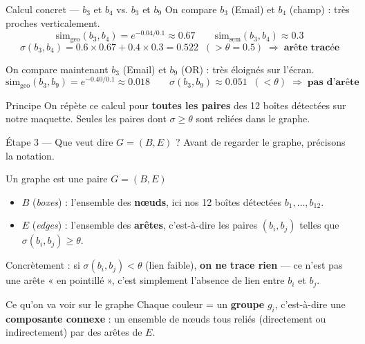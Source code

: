 \documentclass[11pt,aspectratio=169]{beamer}
\begin{document}
\begin{frame}{Calcul concret --- $b_3$ et $b_4$ vs. $b_3$ et $b_9$}
On compare $b_3$ (Email) et $b_4$ (champ) : très proches verticalement.
\[
\text{sim}_{\text{geo}}(b_3,b_4) = e^{-0.04/0.1} \approx 0.67
\qquad
\text{sim}_{\text{sem}}(b_3,b_4) \approx 0.3
\]
\[
\sigma(b_3,b_4) = 0.6 \times 0.67 + 0.4 \times 0.3 = 0.522 \;\; (> \theta = 0.5) \;\Rightarrow\; \textbf{arête tracée}
\]

\vspace{0.3cm}
On compare maintenant $b_3$ (Email) et $b_9$ (OR) : très éloignés sur l'écran.
\[
\text{sim}_{\text{geo}}(b_3,b_9) = e^{-0.40/0.1} \approx 0.018
\qquad
\sigma(b_3,b_9) \approx 0.051 \;\; (< \theta) \;\Rightarrow\; \textbf{pas d'arête}
\]

\begin{block}{Principe}
On répète ce calcul pour \textbf{toutes les paires} des 12 boîtes détectées sur notre maquette. Seules les paires dont $\sigma \geq \theta$ sont reliées dans le graphe.
\end{block}
\end{frame}

\begin{frame}{Étape 3 --- Que veut dire $G = (B,E)$ ?}
Avant de regarder le graphe, précisons la notation.

\vspace{0.3cm}
\begin{block}{Un graphe est une paire $G = (B, E)$}
\begin{itemize}
    \item $B$ (\emph{boxes}) : l'ensemble des \textbf{n\oe{}uds}, ici nos 12 boîtes détectées $b_1, \dots, b_{12}$.
    \item $E$ (\emph{edges}) : l'ensemble des \textbf{arêtes}, c'est-à-dire les paires $(b_i,b_j)$ telles que $\sigma(b_i,b_j) \geq \theta$.
\end{itemize}
\end{block}

\vspace{0.3cm}
Concrètement : si $\sigma(b_i,b_j) < \theta$ (lien faible), \textbf{on ne trace rien} --- ce n'est pas une arête « en pointillé », c'est simplement l'absence de lien entre $b_i$ et $b_j$.

\vspace{0.3cm}
\begin{block}{Ce qu'on va voir sur le graphe}
Chaque couleur = un \textbf{groupe} $g_i$, c'est-à-dire une \textbf{composante connexe} : un ensemble de n\oe{}uds tous reliés (directement ou indirectement) par des arêtes de $E$.
\end{block}
\end{frame}
\end{document}
